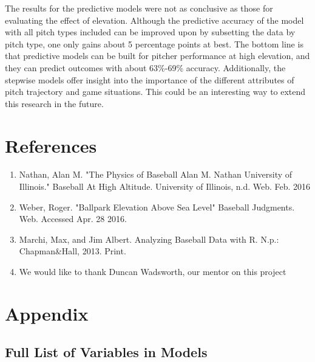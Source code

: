 \documentclass{article}
\begin{document}
The results for the predictive models were not as conclusive as those for evaluating the effect of elevation. Although the predictive accuracy of the model with all pitch types included can be improved upon by subsetting the data by pitch type, one only gains about 5 percentage points at best. The bottom line is that predictive models can be built for pitcher performance at high elevation, and they can predict outcomes with about 63\%-69\% accuracy. Additionally, the stepwise models offer insight into the importance of the different attributes of pitch trajectory and game situations. This could be an interesting way to extend this research in the future.



\section{References}

\begin{enumerate}
    \item Nathan, Alan M. "The Physics of Baseball Alan M. Nathan University of Illinois." Baseball At High Altitude. University of Illinois, n.d. Web. Feb. 2016
    \item Weber, Roger. "Ballpark Elevation Above Sea Level" Baseball Judgments. Web. Accessed Apr. 28 2016.
    \item Marchi, Max, and Jim Albert. Analyzing Baseball Data with R. N.p.: Chapman&Hall, 2013. Print.
    \item We would like to thank Duncan Wadsworth, our mentor on this project
\end{enumerate}

\section{Appendix}

\subsection{Full List of Variables in Models}
\end{document}
